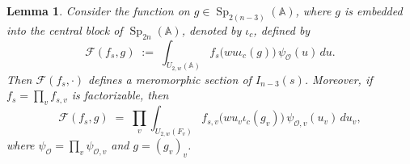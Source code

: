 \documentclass[11pt,notitlepage]{amsart}
\newtheorem{lemma}[theorem]{Lemma}
\theoremstyle{definition}
\theoremstyle{remark}
\newcommand{\calF}{\mathcal{F}}
\newcommand{\calO}{\mathcal{O}}
\newcommand{\bbA}{\mathbb{A}}
\DeclareMathOperator{\Sp}{Sp}
\begin{document}
\begin{lemma}\label{lem:global-section}
Consider the function on $g\in \Sp_{2(n-3)}(\bbA)$, where $g$ is embedded into the central block of $\Sp_{2n}(\bbA)$, denoted by $\iota_{c}$, defined by
\begin{equation}\label{int405}
  \calF(f_s,g) \;:=\; \int_{U_{2,w}(\bbA)} f_s\!\bigl(wu\iota_c(g)\bigr)\,\psi_\calO(u)\,du.
\end{equation}
Then $\calF(f_s,\cdot)$ defines a meromorphic section of $I_{n-3}(s)$.
Moreover, if $f_s=\prod_v f_{s,v}$ is factorizable, then
\begin{equation}\label{int407}
  \calF(f_s,g)
  \;=\;
  \prod_v \int_{U_{2,w}(F_v)} f_{s,v}\!\bigl(wu_v\iota_c(g_v)\bigr)\,\psi_{\calO,v}(u_v)\,du_v,
\end{equation}
where $\psi_\calO=\prod_v \psi_{\calO,v}$ and $g=(g_v)_v$.
\end{lemma}
\end{document}
